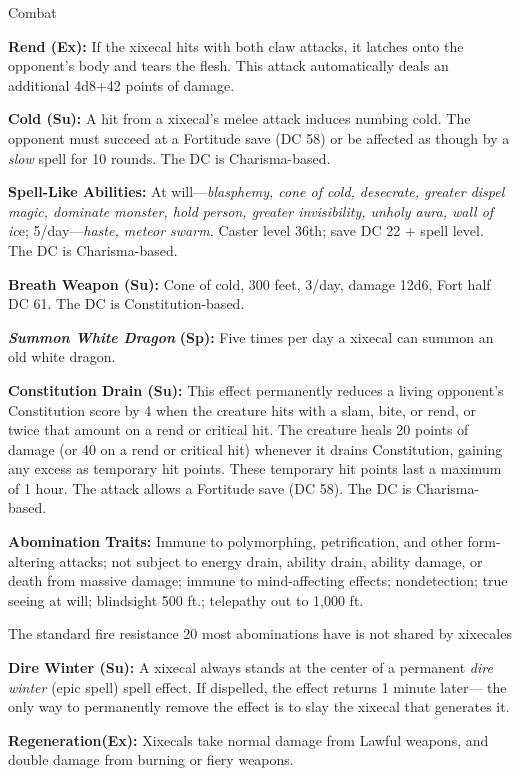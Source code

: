 \documentclass{article}
\begin{document}
Combat\textbf{ }

\textbf{Rend (Ex):} If the xixecal hits with both claw attacks, it latches onto 
the opponent's body and tears the flesh. This attack automatically deals an additional 
4d8+42 points of damage. 

\textbf{Cold (Su):} A hit from a xixecal's melee attack induces numbing cold. The 
opponent must succeed at a Fortitude save (DC 58) or be affected as though by a 
\textit{slow }spell for 10 rounds. The DC is Charisma-based.

\textbf{Spell-Like Abilities:} At will---\textit{blasphemy, cone of cold, desecrate, 
greater dispel magic, dominate monster, hold person, greater invisibility, unholy 
aura, wall of ic}e; 5/day---\textit{haste, meteor swarm. }Caster level 36th; save 
DC 22 + spell level. The DC is Charisma-based.

\textbf{Breath Weapon (Su):} Cone of cold, 300 feet, 3/day, damage 12d6, Fort half 
DC 61. The DC is Constitution-based.

\textit{\textbf{Summon White Dragon }}\textbf{(Sp):} Five times per day a xixecal 
can summon an old white dragon. 

\textbf{Constitution Drain (Su):} This effect permanently reduces a living opponent's 
Constitution score by 4 when the creature hits with a slam, bite, or rend, or twice 
that amount on a rend or critical hit. The creature heals 20 points of damage (or 
40 on a rend or critical hit) whenever it drains Constitution, gaining any excess 
as temporary hit points. These temporary hit points last a maximum of 1 hour. The 
attack allows a Fortitude save (DC 58). The DC is Charisma-based.

\textbf{Abomination Traits:} Immune to polymorphing, petrification, and other form-altering 
attacks; not subject to energy drain, ability drain, ability damage, or death from 
massive damage; immune to mind-affecting effects; nondetection; true seeing at 
will; blindsight 500 ft.; telepathy out to 1,000 ft.

The standard fire resistance 20 most abominations have is not shared by xixecales

\textbf{Dire Winter (Su):} A xixecal always stands at the center of a permanent 
\textit{dire winter} (epic spell)\textit{ }spell effect. If dispelled, the effect 
returns 1 minute later--- the only way to permanently remove the effect is to slay 
the xixecal that generates it. 

\textbf{Regeneration(Ex):} Xixecals take normal damage from Lawful weapons, and 
double damage from burning or fiery weapons. 
\end{document}
